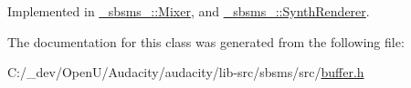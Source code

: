 Implemented in \hyperlink{class__sbsms___1_1_mixer_a92637e536f821f9c0d7fd20475a0f08c}{\+\_\+sbsms\+\_\+\+::\+Mixer}, and \hyperlink{class__sbsms___1_1_synth_renderer_af16a26fa6810b42b90de13fdf8d21330}{\+\_\+sbsms\+\_\+\+::\+Synth\+Renderer}.



The documentation for this class was generated from the following file\+:\begin{DoxyCompactItemize}
\item 
C\+:/\+\_\+dev/\+Open\+U/\+Audacity/audacity/lib-\/src/sbsms/src/\hyperlink{sbsms_2src_2buffer_8h}{buffer.\+h}\end{DoxyCompactItemize}
